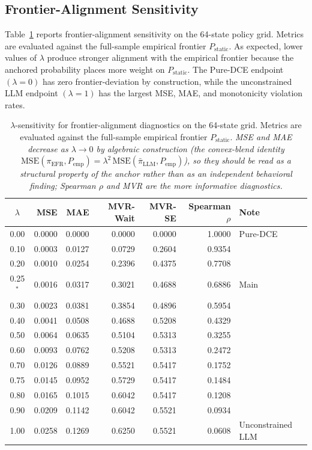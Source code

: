 \documentclass[11pt]{article}
\begin{document}
\subsection{Frontier-Alignment Sensitivity}

Table~\ref{tab:S6} reports frontier-alignment sensitivity on the 64-state policy grid. Metrics are evaluated against the full-sample empirical frontier \(P_{\mathrm{static}}\). As expected, lower values of \(\lambda\) produce stronger alignment with the empirical frontier because the anchored probability places more weight on \(P_{\mathrm{static}}\). The Pure-DCE endpoint \((\lambda=0)\) has zero frontier-deviation by construction, while the unconstrained LLM endpoint \((\lambda=1)\) has the largest MSE, MAE, and monotonicity violation rates.

\begin{table}[htbp]
\centering
\caption{$\lambda$-sensitivity for frontier-alignment diagnostics on the 64-state grid. Metrics are evaluated against the full-sample empirical frontier \(P_{\mathrm{static}}\). \emph{MSE and MAE decrease as $\lambda \to 0$ by algebraic construction (the convex-blend identity $\mathrm{MSE}(\pi_{\mathrm{EFR}}, P_{\mathrm{emp}}) = \lambda^2\,\mathrm{MSE}(\bar\pi_{\mathrm{LLM}}, P_{\mathrm{emp}})$), so they should be read as a structural property of the anchor rather than as an independent behavioral finding; Spearman $\rho$ and MVR are the more informative diagnostics.}}
\label{tab:S6}
\begin{tabular}{c r r r r r l}
\toprule
\(\lambda\) & MSE & MAE & MVR-Wait & MVR-SE & Spearman \(\rho\) & Note \\
\midrule
0.00 & 0.0000 & 0.0000 & 0.0000 & 0.0000 & 1.0000 & Pure-DCE \\
0.10 & 0.0003 & 0.0127 & 0.0729 & 0.2604 & 0.9354 &  \\
0.20 & 0.0010 & 0.0254 & 0.2396 & 0.4375 & 0.7708 &  \\
0.25\(^*\) & 0.0016 & 0.0317 & 0.3021 & 0.4688 & 0.6886 & Main \\
0.30 & 0.0023 & 0.0381 & 0.3854 & 0.4896 & 0.5954 &  \\
0.40 & 0.0041 & 0.0508 & 0.4688 & 0.5208 & 0.4329 &  \\
0.50 & 0.0064 & 0.0635 & 0.5104 & 0.5313 & 0.3255 &  \\
0.60 & 0.0093 & 0.0762 & 0.5208 & 0.5313 & 0.2472 &  \\
0.70 & 0.0126 & 0.0889 & 0.5521 & 0.5417 & 0.1752 &  \\
0.75 & 0.0145 & 0.0952 & 0.5729 & 0.5417 & 0.1484 &  \\
0.80 & 0.0165 & 0.1015 & 0.6042 & 0.5417 & 0.1208 &  \\
0.90 & 0.0209 & 0.1142 & 0.6042 & 0.5521 & 0.0934 &  \\
1.00 & 0.0258 & 0.1269 & 0.6250 & 0.5521 & 0.0608 & Unconstrained LLM \\
\bottomrule
\end{tabular}


\end{table}
\end{document}
